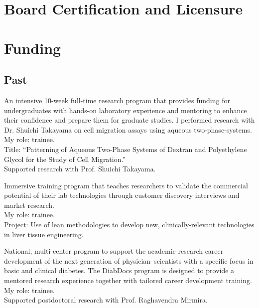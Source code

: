 \documentclass{komacv}
\begin{document}
\section{Board Certification and Licensure}


\section{Funding}

\subsection{Past}

{An intensive 10-week full-time research program that provides funding for undergraduates with hands-on laboratory experience and mentoring to enhance their confidence and prepare them for graduate studies. I performed research with Dr. Shuichi Takayama on cell migration assays using aqueous two-phase-systems.\\
My role: trainee.\\
Title: ``Patterning of Aqueous Two-Phase Systems of Dextran and Polyethylene Glycol for the Study of Cell Migration.''\\
Supported research with Prof. Shuichi Takayama.}

{Immersive training program that teaches researchers to validate the commercial potential of their lab technologies through customer discovery interviews and market research.\\
My role: trainee.\\
Project: Use of lean methodologies to develop new, clinically-relevant technologies in liver tissue engineering.}

{National, multi-center program to support the academic research career development of the next generation of physician--scientists with a specific focus in basic and clinical diabetes. The DiabDocs program is designed to provide a mentored research experience together with tailored career development training.\\
My role: trainee.\\
Supported postdoctoral research with Prof. Raghavendra Mirmira.}
\end{document}
